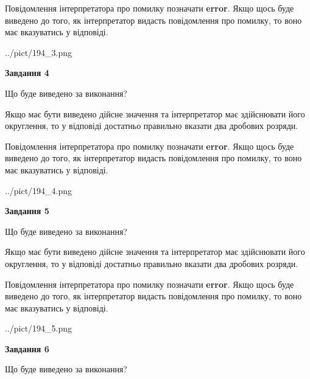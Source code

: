 \documentclass[12pt, ukrainian]{article}
\begin{document}
{\begin {Large}
Повідомлення інтерпретатора про помилку позначати \textbf{error}.
Якщо щось буде виведено до того, як інтерпретатор видасть повідомлення про помилку, 
то воно має вказуватись у відповіді. \par

\begin{center}
	{../pict/194_3.png}
\end{center}
\newpage

{\begin {center}\textbf{Завдання 4}\end {center}}\par
Що буде виведено за виконання? \par

Якщо має бути виведено дійсне значення та інтерпретатор має здійснювати його округлення, 
то у відповіді достатньо правильно вказати два дробових розряди.

Повідомлення інтерпретатора про помилку позначати \textbf{error}.
Якщо щось буде виведено до того, як інтерпретатор видасть повідомлення про помилку, 
то воно має вказуватись у відповіді. \par

\begin{center}
	{../pict/194_4.png}
\end{center}
\newpage

{\begin {center}\textbf{Завдання 5}\end {center}}\par
Що буде виведено за виконання? \par

Якщо має бути виведено дійсне значення та інтерпретатор має здійснювати його округлення, 
то у відповіді достатньо правильно вказати два дробових розряди.

Повідомлення інтерпретатора про помилку позначати \textbf{error}.
Якщо щось буде виведено до того, як інтерпретатор видасть повідомлення про помилку, 
то воно має вказуватись у відповіді. \par

\begin{center}
	{../pict/194_5.png}
\end{center}
\newpage

{\begin {center}\textbf{Завдання 6}\end {center}}\par
Що буде виведено за виконання? \par


\end{Large}}
\end{document}
